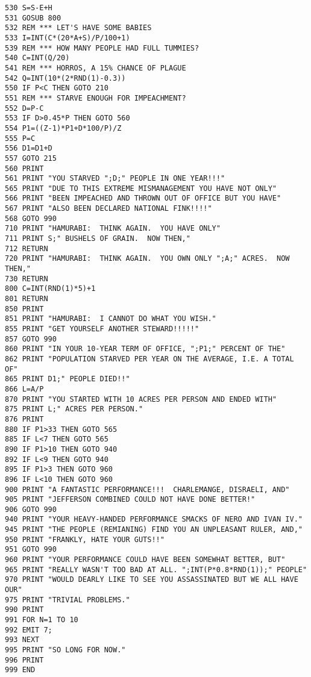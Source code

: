 \begin{lstlisting}
530 S=S-E+H
531 GOSUB 800
532 REM *** LET'S HAVE SOME BABIES
533 I=INT(C*(20*A+S)/P/100+1)
539 REM *** HOW MANY PEOPLE HAD FULL TUMMIES?
540 C=INT(Q/20)
541 REM *** HORROS, A 15% CHANCE OF PLAGUE
542 Q=INT(10*(2*RND(1)-0.3))
550 IF P<C THEN GOTO 210
551 REM *** STARVE ENOUGH FOR IMPEACHMENT?
552 D=P-C
553 IF D>0.45*P THEN GOTO 560
554 P1=((Z-1)*P1+D*100/P)/Z
555 P=C
556 D1=D1+D
557 GOTO 215
560 PRINT
561 PRINT "YOU STARVED ";D;" PEOPLE IN ONE YEAR!!!"
565 PRINT "DUE TO THIS EXTREME MISMANAGEMENT YOU HAVE NOT ONLY"
566 PRINT "BEEN IMPEACHED AND THROWN OUT OF OFFICE BUT YOU HAVE"
567 PRINT "ALSO BEEN DECLARED NATIONAL FINK!!!!"
568 GOTO 990
710 PRINT "HAMURABI:  THINK AGAIN.  YOU HAVE ONLY"
711 PRINT S;" BUSHELS OF GRAIN.  NOW THEN,"
712 RETURN
720 PRINT "HAMURABI:  THINK AGAIN.  YOU OWN ONLY ";A;" ACRES.  NOW THEN,"
730 RETURN
800 C=INT(RND(1)*5)+1
801 RETURN
850 PRINT
851 PRINT "HAMURABI:  I CANNOT DO WHAT YOU WISH."
855 PRINT "GET YOURSELF ANOTHER STEWARD!!!!!"
857 GOTO 990
860 PRINT "IN YOUR 10-YEAR TERM OF OFFICE, ";P1;" PERCENT OF THE"
862 PRINT "POPULATION STARVED PER YEAR ON THE AVERAGE, I.E. A TOTAL OF"
865 PRINT D1;" PEOPLE DIED!!"
866 L=A/P
870 PRINT "YOU STARTED WITH 10 ACRES PER PERSON AND ENDED WITH"
875 PRINT L;" ACRES PER PERSON."
876 PRINT
880 IF P1>33 THEN GOTO 565
885 IF L<7 THEN GOTO 565
890 IF P1>10 THEN GOTO 940
892 IF L<9 THEN GOTO 940
895 IF P1>3 THEN GOTO 960
896 IF L<10 THEN GOTO 960
900 PRINT "A FANTASTIC PERFORMANCE!!!  CHARLEMANGE, DISRAELI, AND"
905 PRINT "JEFFERSON COMBINED COULD NOT HAVE DONE BETTER!"
906 GOTO 990
940 PRINT "YOUR HEAVY-HANDED PERFORMANCE SMACKS OF NERO AND IVAN IV."
945 PRINT "THE PEOPLE (REMIANING) FIND YOU AN UNPLEASANT RULER, AND,"
950 PRINT "FRANKLY, HATE YOUR GUTS!!"
951 GOTO 990
960 PRINT "YOUR PERFORMANCE COULD HAVE BEEN SOMEWHAT BETTER, BUT"
965 PRINT "REALLY WASN'T TOO BAD AT ALL. ";INT(P*0.8*RND(1));" PEOPLE"
970 PRINT "WOULD DEARLY LIKE TO SEE YOU ASSASSINATED BUT WE ALL HAVE OUR"
975 PRINT "TRIVIAL PROBLEMS."
990 PRINT
991 FOR N=1 TO 10
992 EMIT 7;
993 NEXT
995 PRINT "SO LONG FOR NOW."
996 PRINT
999 END
\end{lstlisting}
